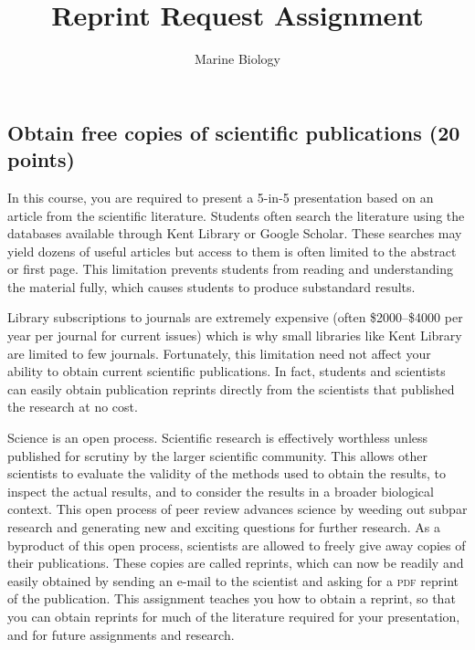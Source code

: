 \documentclass[12pt]{article}
\title{Reprint Request Assignment}
\author{Marine Biology}
\date{}                                           %
\begin{document}
\thispagestyle{plain}


\subsection*{Obtain free copies of scientific publications (20 points)}

In this course, you are required
to present a 5-in-5 presentation based on an article from the
scientific literature. Students often search the literature using the
databases available through Kent Library or Google Scholar. These
searches may yield dozens of useful  articles but access to them is often limited to the abstract or first page. This limitation
prevents students from reading and understanding the material fully, 
which causes students to produce substandard results.

Library subscriptions to journals are extremely expensive (often \$2000--\$4000
per year per journal for current issues) which is why small
libraries like Kent Library are limited to few journals.
Fortunately, this limitation need not affect your ability to obtain
current scientific publications. In fact, students and scientists can
easily obtain publication reprints directly from the scientists that
published the research at no cost.

Science is an open process. Scientific research is effectively worthless
unless published for scrutiny by the larger scientific community. This
allows other scientists to evaluate the validity of the methods used to
obtain the results, to inspect the actual results, and to consider the
results in a broader biological context. This open process of peer
review advances science by weeding out subpar research and generating
new and exciting questions for further research. As a byproduct of this
open process, scientists are allowed to freely give away copies of their
publications. These copies are called reprints, which can now be readily
and easily obtained by sending an e-mail to the scientist and asking for
a \textsc{pdf} reprint of the publication.  This assignment teaches you how to obtain a reprint, so that you can
obtain reprints for much of the literature required for your
presentation, and for future assignments and research.
\end{document}
